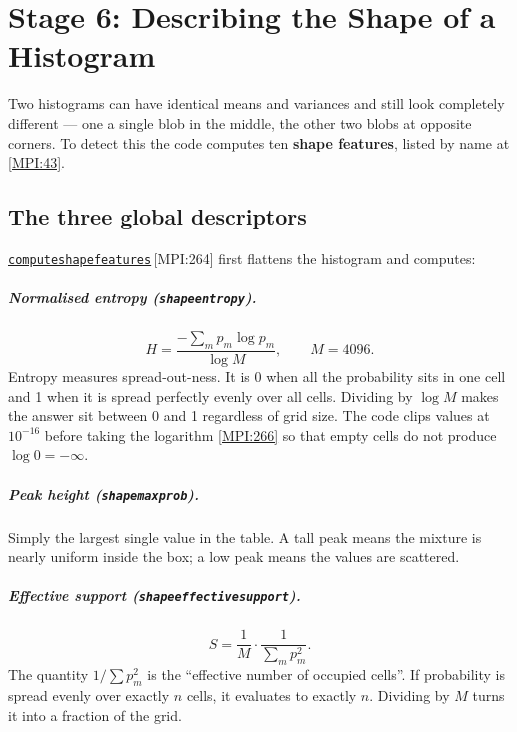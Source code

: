 \documentclass[11pt,a4paper]{report}
\newcommand{\srcbase}{vscode://file/Users/syellapa/Documents/Research/2026/ANSYS/Multi-ScalarPDF}
\newcommand{\srctag}[1]{{\footnotesize\textcolor{TagGray}{[#1]}}}
\newcommand{\Mpi}[2]{\href{\srcbase/EnsightPDFHybridDatasetMPI.py:#1}{\texttt{#2}}\,\srctag{MPI:#1}}
\newcommand{\MpiL}[1]{\href{\srcbase/EnsightPDFHybridDatasetMPI.py:#1}{\srctag{MPI:#1}}}
\newcommand{\code}[1]{\texttt{#1}}
\newcommand{\term}[1]{\textbf{#1}}
\renewcommand{\_}{\origtextunderscore\allowbreak}
\begin{document}
\chapter{Stage 6: Describing the Shape of a Histogram}

Two histograms can have identical means and variances and still look completely different ---
one a single blob in the middle, the other two blobs at opposite corners. To detect this the
code computes ten \term{shape features}, listed by name at \MpiL{43}.

\section{The three global descriptors}

\Mpi{264}{compute\_shape\_features} first flattens the histogram and computes:

\paragraph{Normalised entropy (\code{shape\_entropy}).}
\[
  H = \frac{-\sum_{m} p_m \log p_m}{\log M}, \qquad M = 4096 .
\]
Entropy measures spread-out-ness. It is 0 when all the probability sits in one cell and 1
when it is spread perfectly evenly over all cells. Dividing by $\log M$ makes the answer sit
between 0 and 1 regardless of grid size. The code clips values at $10^{-16}$ before taking
the logarithm \MpiL{266} so that empty cells do not produce $\log 0 = -\infty$.

\paragraph{Peak height (\code{shape\_max\_prob}).}
Simply the largest single value in the table. A tall peak means the mixture is nearly uniform
inside the box; a low peak means the values are scattered.

\paragraph{Effective support (\code{shape\_effective\_support}).}
\[
  S = \frac{1}{M}\cdot\frac{1}{\sum_m p_m^2} .
\]
The quantity $1/\sum p_m^2$ is the ``effective number of occupied cells''. If probability is
spread evenly over exactly $n$ cells, it evaluates to exactly $n$. Dividing by $M$ turns it
into a fraction of the grid.
\end{document}
